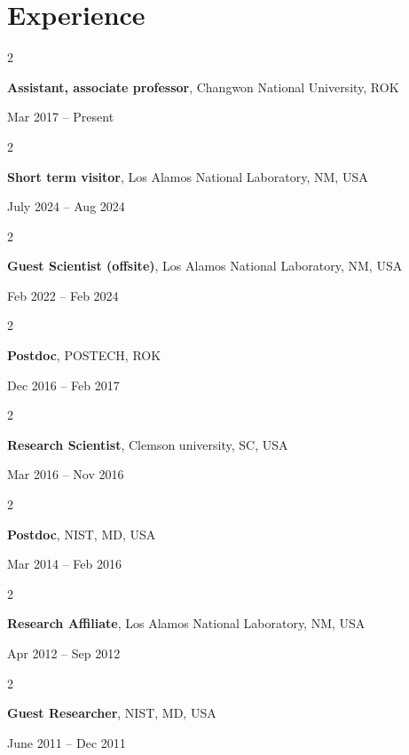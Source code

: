 \documentclass[10pt, letterpaper]{article}
\newenvironment{twocolentry}[2][]{
    \onecolentry
    \def\secondColumn{#2}
    \setcolumnwidth{\fill, 4.5 cm}
    \begin{paracol}{2}
}{
    \switchcolumn \raggedleft \secondColumn
    \end{paracol}
    \endonecolentry
} %
\begin{document}
    \section{Experience}
        \begin{twocolentry}{Mar 2017 – Present}
            \textbf{Assistant, associate professor}, Changwon National University, ROK
        \end{twocolentry}
        \vspace{0.10 cm}
        \begin{twocolentry}{July 2024 – Aug 2024}
            \textbf{Short term visitor}, Los Alamos National Laboratory, NM, USA
        \end{twocolentry}
        \vspace{0.10 cm}
        \begin{twocolentry}{Feb 2022 – Feb 2024}
            \textbf{Guest Scientist (offsite)}, Los Alamos National Laboratory, NM, USA
        \end{twocolentry}
        \vspace{0.10 cm}
        \begin{twocolentry}{Dec 2016 – Feb 2017}
            \textbf{Postdoc}, POSTECH, ROK
        \end{twocolentry}
        \vspace{0.10 cm}
        \begin{twocolentry}{Mar 2016 – Nov 2016}
            \textbf{Research Scientist}, Clemson university, SC, USA
        \end{twocolentry}
        \vspace{0.10 cm}
        \begin{twocolentry}{Mar 2014 – Feb 2016}
            \textbf{Postdoc}, NIST, MD, USA
        \end{twocolentry}
        \vspace{0.10 cm}
        \begin{twocolentry}{Apr 2012 – Sep 2012}
            \textbf{Research Affiliate}, Los Alamos National Laboratory, NM, USA
        \end{twocolentry}
        \vspace{0.10 cm}
        \begin{twocolentry}{June 2011 – Dec 2011}
            \textbf{Guest Researcher}, NIST, MD, USA
        \end{twocolentry}
        \vspace{0.10 cm}

\end{document}
